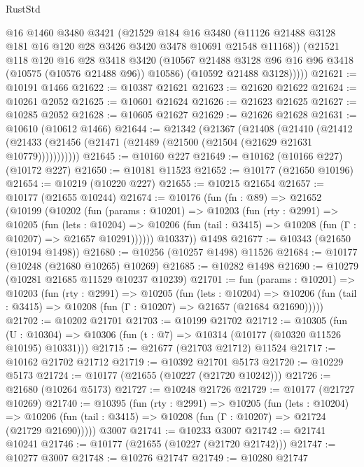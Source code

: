 \begin{lexlean}{RustStd}
\begin{coremodule}
          @16
          @1460
          @3480
          @3421
          (@21529
            @184
            @16
            @3480
            (@11126 @21488 @3128 @181 @16 @120 @28 @3426 @3420 @3478 @10691 @21548 @11168))
          (@21521
            @118
            @120
            @16
            @28
            @3418
            @3420
            (@10567 @21488 @3128 @96 @16 @96 @3418 (@10575 (@10576 @21488 @96)) @10586)
            (@10592 @21488 @3128)))))
@21621 := @10191 @1466
@21622 := @10387 @21621
@21623 := @21620 @21622
@21624 := @10261 @2052
@21625 := @10601 @21624
@21626 := @21623 @21625
@21627 := @10285 @2052
@21628 := @10605 @21627
@21629 := @21626 @21628
@21631 := @10610 (@10612 @1466)
@21644 := @21342
    (@21367
      (@21408
        (@21410
          (@21412 (@21433 (@21456 (@21471 (@21489 (@21500 (@21504 (@21629 @21631 @10779)))))))))))
@21645 := @10160 @227
@21649 := @10162 (@10166 @227) (@10172 @227)
@21650 := @10181 @11523
@21652 := @10177 (@21650 @10196)
@21654 := @10219 (@10220 @227)
@21655 := @10215 @21654
@21657 := @10177 (@21655 @10244)
@21674 := @10176
    (fun (fn : @89) =>
    @21652
      (@10199
        (@10202
          (fun (params : @10201) =>
          @10203
            (fun (rty : @2991) =>
            @10205
              (fun (lets : @10204) =>
              @10206 (fun (tail : @3415) => @10208 (fun (Γ : @10207) => @21657 @10291))))))
        @10337))
    @1498
@21677 := @10343 (@21650 (@10194 @1498))
@21680 := @10256 (@10257 @1498) @11526
@21684 := @10177 (@10248 (@21680 @10265) @10269)
@21685 := @10282 @1498
@21690 := @10279 (@10281 @21685 @11529 @10237 @10239)
@21701 := fun (params : @10201) =>
  @10203
    (fun (rty : @2991) =>
    @10205
      (fun (lets : @10204) =>
      @10206 (fun (tail : @3415) => @10208 (fun (Γ : @10207) => @21657 (@21684 @21690)))))
@21702 := @10202 @21701
@21703 := @10199 @21702
@21712 := @10305
    (fun (U : @10304) => @10306 (fun (t : @7) => @10314 (@10177 (@10320 @11526 @10195) @10331)))
@21715 := @21677 (@21703 @21712) @11524
@21717 := @10162 @21702 @21712
@21719 := @10392 @21701 @5173
@21720 := @10229 @5173
@21724 := @10177 (@21655 (@10227 (@21720 @10242)))
@21726 := @21680 (@10264 @5173)
@21727 := @10248 @21726
@21729 := @10177 (@21727 @10269)
@21740 := @10395
    (fun (rty : @2991) =>
    @10205
      (fun (lets : @10204) =>
      @10206 (fun (tail : @3415) => @10208 (fun (Γ : @10207) => @21724 (@21729 @21690)))))
    @3007
@21741 := @10233 @3007
@21742 := @21741 @10241
@21746 := @10177 (@21655 (@10227 (@21720 @21742)))
@21747 := @10277 @3007
@21748 := @10276 @21747
@21749 := @10280 @21747

\end{coremodule}
\end{lexlean}
